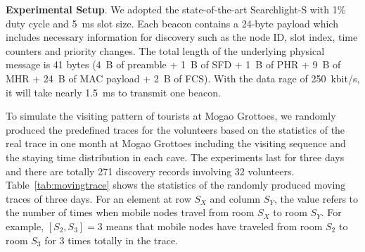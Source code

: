 \documentclass[twoside,twocolumn]{article}
\begin{document}
{\bf Experimental Setup}. We adopted the state-of-the-art Searchlight-S with 1\% duty 
cycle and 5~ms slot size. Each beacon contains a 24-byte payload which includes 
necessary information for discovery such as the node ID, slot index, time counters and
priority changes. The total length of the underlying physical message is 41 bytes (4~B 
of preamble + 1~B of SFD + 1~B of PHR + 9~B of MHR + 24~B of MAC payload + 2~B of FCS).
With the data rage of 250~kbit/s, it will take nearly 1.5~ms to transmit one beacon.

\begin{table}[t]
  \centering
  \footnotesize
  \caption{Randomly produced moving trace.}
  \label{tab:movingtrace}
\end{table}

To simulate the visiting pattern of tourists at Mogao Grottoes, we randomly produced
the predefined traces for the volunteers based on the statistics of the real trace in 
one month at Mogao Grottoes including the visiting sequence and the staying time 
distribution in each cave. The experiments last for three days and there are totally 
271 discovery records involving 32 volunteers. Table~\ref{tab:movingtrace} shows the 
statistics of the randomly produced moving traces of three days. For an element at 
row $S_X$ and column $S_Y$, the value refers to the number of times when mobile nodes 
travel from room $S_X$ to room $S_Y$. For example, $[S_2, S_3] = 3$ means that mobile 
nodes have traveled from room $S_2$ to room $S_3$ for 3 times totally in the trace.
\end{document}
